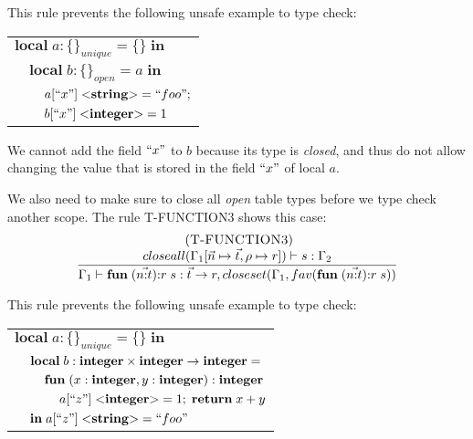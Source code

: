 This rule prevents the following unsafe example to type check:
\begin{center}
\begin{tabular}{lll}
\multicolumn{3}{l}{$\mathbf{local} \; a:\{\}_{unique} = \{\} \; \mathbf{in}$}\\
& \multicolumn{2}{l}{$\mathbf{local} \; b:\{\}_{open} = a \; \mathbf{in}$}\\
& & \multicolumn{1}{l}{$a[``x"] \; {<}\mathbf{string}{>} = ``foo";$}\\
& & \multicolumn{1}{l}{$b[``x"] \; {<}\mathbf{integer}{>} = 1$}\\
\end{tabular}
\end{center}

We cannot add the field $``x"$ to $b$ because its type is \emph{closed},
and thus do not allow changing the value that is stored in the field $``x"$
of local $a$.

We also need to make sure to close all \emph{open} table types before we
type check another scope.
The rule \textsc{T-FUNCTION3} shows this case:
\[
\begin{array}{c}
\; (\textsc{T-FUNCTION3})\\
\dfrac{closeall(\Gamma_{1}[\vec{n} \mapsto \vec{t}, \rho \mapsto r]) \vdash s:\Gamma_{2}}
      {\Gamma_{1} \vdash \mathbf{fun} \; (\vec{n{:}t}){:}r \; s:\vec{t} \rightarrow r, closeset(\Gamma_{1}, fav(\mathbf{fun} \; (\vec{n{:}t}){:}r \; s))}
\end{array}
\]

This rule prevents the following unsafe example to type check:
\begin{center}
\begin{tabular}{llll}
\multicolumn{4}{l}{$\mathbf{local} \; a:\{\}_{unique} = \{\} \; \mathbf{in}$}\\
& \multicolumn{3}{l}{$\mathbf{local} \; b:\mathbf{integer} \times \mathbf{integer} \rightarrow \mathbf{integer} =$}\\
& & \multicolumn{2}{l}{$\mathbf{fun} \; (x:\mathbf{integer}, y:\mathbf{integer}):\mathbf{integer}$}\\
& & & \multicolumn{1}{l}{$a[``z"] \; {<}\mathbf{integer}{>} = 1; \; \mathbf{return} \; x + y$}\\
& \multicolumn{3}{l}{$\mathbf{in} \; a[``z"] \; {<}\mathbf{string}{>} = ``foo"$}
\end{tabular}
\end{center}

